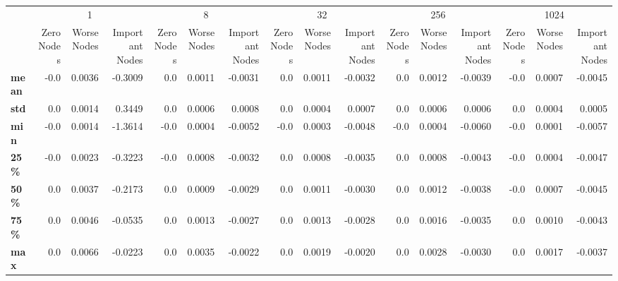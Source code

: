 \begin{tabular}{lrrrrrrrrrrrrrrr}
\toprule
{} & \multicolumn{3}{c}{1} & \multicolumn{3}{c}{8} & \multicolumn{3}{c}{32} & \multicolumn{3}{c}{256} & \multicolumn{3}{c}{1024} \\
{} & Zero Nodes & Worse Nodes & Important Nodes & Zero Nodes & Worse Nodes & Important Nodes & Zero Nodes & Worse Nodes & Important Nodes & Zero Nodes & Worse Nodes & Important Nodes & Zero Nodes & Worse Nodes & Important Nodes \\
\midrule
\textbf{mean} &       -0.0 &      0.0036 &         -0.3009 &        0.0 &      0.0011 &         -0.0031 &        0.0 &      0.0011 &         -0.0032 &        0.0 &      0.0012 &         -0.0039 &       -0.0 &      0.0007 &         -0.0045 \\
\textbf{std } &        0.0 &      0.0014 &          0.3449 &        0.0 &      0.0006 &          0.0008 &        0.0 &      0.0004 &          0.0007 &        0.0 &      0.0006 &          0.0006 &        0.0 &      0.0004 &          0.0005 \\
\textbf{min } &       -0.0 &      0.0014 &         -1.3614 &       -0.0 &      0.0004 &         -0.0052 &       -0.0 &      0.0003 &         -0.0048 &       -0.0 &      0.0004 &         -0.0060 &       -0.0 &      0.0001 &         -0.0057 \\
\textbf{25\% } &       -0.0 &      0.0023 &         -0.3223 &       -0.0 &      0.0008 &         -0.0032 &        0.0 &      0.0008 &         -0.0035 &        0.0 &      0.0008 &         -0.0043 &       -0.0 &      0.0004 &         -0.0047 \\
\textbf{50\% } &        0.0 &      0.0037 &         -0.2173 &        0.0 &      0.0009 &         -0.0029 &        0.0 &      0.0011 &         -0.0030 &        0.0 &      0.0012 &         -0.0038 &       -0.0 &      0.0007 &         -0.0045 \\
\textbf{75\% } &        0.0 &      0.0046 &         -0.0535 &        0.0 &      0.0013 &         -0.0027 &        0.0 &      0.0013 &         -0.0028 &        0.0 &      0.0016 &         -0.0035 &        0.0 &      0.0010 &         -0.0043 \\
\textbf{max } &        0.0 &      0.0066 &         -0.0223 &        0.0 &      0.0035 &         -0.0022 &        0.0 &      0.0019 &         -0.0020 &        0.0 &      0.0028 &         -0.0030 &        0.0 &      0.0017 &         -0.0037 \\
\bottomrule
\end{tabular}
